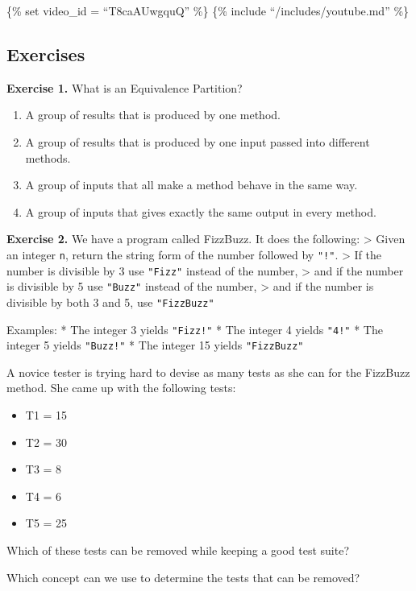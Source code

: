 \{\% set video\_id = ``T8caAUwgquQ'' \%\} \{\% include
``/includes/youtube.md'' \%\}

\hypertarget{exercises}{%
\subsection{Exercises}\label{exercises}}

\textbf{Exercise 1.} What is an Equivalence Partition?

\begin{enumerate}
\def\labelenumi{\arabic{enumi}.}
\tightlist
\item
  A group of results that is produced by one method.
\item
  A group of results that is produced by one input passed into different
  methods.
\item
  A group of inputs that all make a method behave in the same way.
\item
  A group of inputs that gives exactly the same output in every method.
\end{enumerate}

\textbf{Exercise 2.} We have a program called FizzBuzz. It does the
following: \textgreater{} Given an integer \texttt{n}, return the string
form of the number followed by \texttt{"!"}. \textgreater{} If the
number is divisible by 3 use \texttt{"Fizz"} instead of the number,
\textgreater{} and if the number is divisible by 5 use \texttt{"Buzz"}
instead of the number, \textgreater{} and if the number is divisible by
both 3 and 5, use \texttt{"FizzBuzz"}

Examples: * The integer 3 yields \texttt{"Fizz!"} * The integer 4 yields
\texttt{"4!"} * The integer 5 yields \texttt{"Buzz!"} * The integer 15
yields \texttt{"FizzBuzz"}

A novice tester is trying hard to devise as many tests as she can for
the FizzBuzz method. She came up with the following tests:

\begin{itemize}
\tightlist
\item
  T1 = 15
\item
  T2 = 30
\item
  T3 = 8
\item
  T4 = 6
\item
  T5 = 25
\end{itemize}

Which of these tests can be removed while keeping a good test suite?

Which concept can we use to determine the tests that can be removed?

